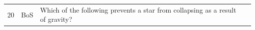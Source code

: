 \documentclass[10pt]{article}
\begin{document}
\begin{tiny}
\begin{longtable}{r p{0.3in} p{1.212in} p{3.8in}}
    20 &          BoS &                                                                                                                                                                                                   Which of the following prevents a star from collapsing as a result of gravity? &                                                                                                                                                                                                                                                                                                                                                                                                                                                                                                                                                                                                                                                                                                                                                                                                                                                                                                                                                                                                                                                                                                                                                                                                                                                                                                                                                                                                                                                                                                                                                                                                                                                                                                                                                                                                                                                                                                                                                                                                                                                                                                                                                                                                                                                                                                                                                                                                                                                                                                                                                                                                                                                                                                                                                                                                                                                                                                                                                                                                                                                                                               
\end{longtable}
\end{tiny}
\end{document}
